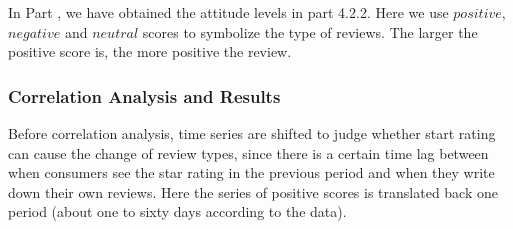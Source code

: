 \documentclass{mcmthesis}
\begin{document}
\quad \quad In Part \uppercase\expandafter{}, we have obtained the attitude levels in part 4.2.2. Here we use $positive$,$negative$ and $neutral$ scores to symbolize the type of reviews. The larger the positive score is, the more positive the review.

\subsubsection{Correlation Analysis and Results}

\quad \quad Before correlation analysis, time series are shifted to judge whether start rating can cause the change of review types, since there is a certain time lag between when consumers see the star rating in the previous period and when they write down their own reviews. Here the series of positive scores is translated back one period (about one to sixty days according to the data). 
\end{document}
